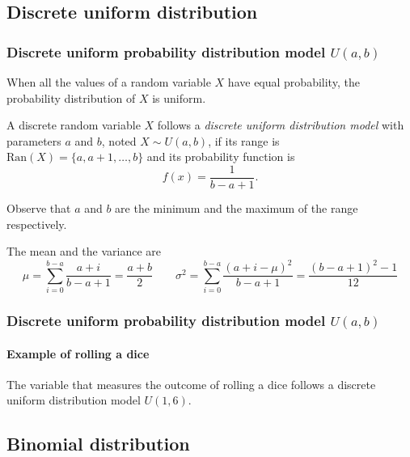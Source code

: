 \subsection{Discrete uniform distribution}

\begin{frame}
\frametitle{Discrete uniform probability distribution model $U(a,b)$}
When all the values of a random variable $X$ have equal probability, the probability distribution of $X$ is uniform.

\begin{definition}
A discrete random variable $X$ follows a \emph{discrete uniform distribution model} with parameters $a$ and $b$, noted 
$X\sim U(a,b)$, if its range is $\mbox{Ran}(X) = \{a, a+1, \ldots,b\}$ and its probability function is
\[f(x)=\frac{1}{b-a+1}.\]
\end{definition}

Observe that $a$ and $b$ are the minimum and the maximum of the range respectively. 

The mean and the variance are
\[
\mu = \sum_{i=0}^{b-a}\frac{a+i}{b-a+1}=\frac{a+b}{2} \qquad \sigma^2 =\sum_{i=0}^{b-a}\frac{(a+i-\mu)^2}{b-a+1}=
\frac{(b-a+1)^2-1}{12}
\]
\end{frame}


\begin{frame}
\frametitle{Discrete uniform probability distribution model $U(a,b)$}
\framesubtitle{Example of rolling a dice}
The variable that measures the outcome of rolling a dice follows a discrete uniform distribution model $U(1,6)$.
\begin{center}
\end{center}
\end{frame}


\subsection{Binomial distribution}

